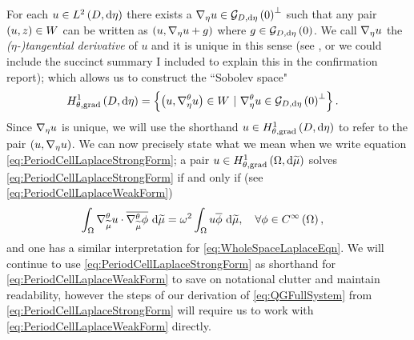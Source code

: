 For each $u\in L^{2}\left( D,\mathrm{d}\eta \right)$ there exists a $\nabla_\eta u\in\mathcal{G}_{ D, \mathrm{d}\eta}\left( 0 \right)^{\perp}$ such that any pair $\left( u,z \right)\in W$ can be written as $\left( u,\nabla_\eta u + g \right)$ where $g\in\mathcal{G}_{ D, \mathrm{d}\eta}\left( 0 \right)$.
We call $\nabla_\eta u$ the \emph{($\eta$-)tangential derivative} of $u$ and it is unique in this sense (see , or we could include the succinct summary I included to explain this in the confirmation report); which allows us to construct the ``Sobolev space"
\begin{align*}
	\gradSobQM{D}{\eta} &= \clbracs{ \bracs{u, \tgrad_\eta u}\in W \ \vert \ \tgrad_\eta u \in \gradZero{D}{\eta}^{\perp} }.
\end{align*}
Since $\nabla_\eta u$ is unique, we will use the shorthand $u\in H^1_{\theta, \mathrm{grad}}\left( D, \mathrm{d}\eta \right)$ to refer to the pair $\left( u, \nabla_\eta u \right)$. 
We can now precisely state what we mean when we write equation \eqref{eq:PeriodCellLaplaceStrongForm}; a pair $u\in H^1_{\theta, \mathrm{grad}}\left( \Omega, \mathrm{d}\widetilde{\mu} \right)$ solves \eqref{eq:PeriodCellLaplaceStrongForm} if and only if (see \eqref{eq:PeriodCellLaplaceWeakForm})
\begin{align*}
	\int_{\Omega}\nabla^{\theta}_{\widetilde{\mu}}u\cdot\overline{\nabla^{\theta}_{\widetilde{\mu}}\phi} \ \mathrm{d}\widetilde{\mu} &= \omega^2\int_{\Omega}u\overline{\phi} \ \mathrm{d}\widetilde{\mu}, \quad\forall \phi\in C^{\infty}\left( \Omega \right),
\end{align*}
and one has a similar interpretation for \eqref{eq:WholeSpaceLaplaceEqn}.
We will continue to use \eqref{eq:PeriodCellLaplaceStrongForm} as shorthand for \eqref{eq:PeriodCellLaplaceWeakForm} to save on notational clutter and maintain readability, however the steps of our derivation of \eqref{eq:QGFullSystem} from \eqref{eq:PeriodCellLaplaceStrongForm} will require us to work with \eqref{eq:PeriodCellLaplaceWeakForm} directly. \newline

